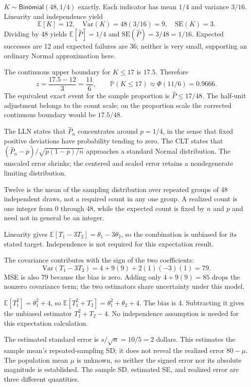 \documentclass[11pt]{article}
\begin{document}
\begin{parts}
\item $K\sim\mathsf{Binomial}(48,1/4)$ exactly. Each indicator has mean $1/4$ and variance $3/16$. Linearity and independence yield
\[
\mathbb E[K]=12,\quad \mathrm{Var}(K)=48(3/16)=9,\quad \mathrm{SE}(K)=3.
\]
Dividing by 48 yields $\mathbb E[\widehat P]=1/4$ and $\mathrm{SE}(\widehat P)=3/48=1/16$. Expected successes are 12 and expected failures are 36; neither is very small, supporting an ordinary Normal approximation here.
\item The continuous upper boundary for $K\leq17$ is $17.5$. Therefore
\[
z=\frac{17.5-12}{3}=\frac{11}{6},\qquad
\mathbb P(K\leq17)\approx\Phi(11/6)=0.9666.
\]
The equivalent exact event for the sample proportion is $\widehat P\leq17/48$. The half-unit adjustment belongs to the count scale; on the proportion scale the corrected continuous boundary would be $17.5/48$.
\item The LLN states that $\widehat P_n$ concentrates around $p=1/4$, in the sense that fixed positive deviations have probability tending to zero. The CLT states that $(\widehat P_n-p)/\sqrt{p(1-p)/n}$ approaches a standard Normal distribution. The unscaled error shrinks; the centered and scaled error retains a nondegenerate limiting distribution.
\item Twelve is the mean of the sampling distribution over repeated groups of 48 independent draws, not a required count in any one group. A realized count is one integer from 0 through 48, while the expected count is fixed by $n$ and $p$ and need not in general be an integer.
\end{parts}

\begin{parts}
\item Linearity gives $\mathbb E[T_1-3T_2]=\theta_1-3\theta_2$, so the combination is unbiased for its stated target. Independence is not required for this expectation result.
\item The covariance contributes with the sign of the two coefficients:
\[
\mathrm{Var}(T_1-3T_2)=4+9(9)+2(1)(-3)(1)=79.
\]
MSE is also 79 because the bias is zero. Adding only $4+9(9)=85$ drops the nonzero covariance term; the two estimators share uncertainty under this model.
\item $\mathbb E[T_1^2]=\theta_1^2+4$, so $\mathbb E[T_1^2+T_2]=\theta_1^2+\theta_2+4$. The bias is 4. Subtracting it gives the unbiased estimator $T_1^2+T_2-4$. No independence assumption is needed for this expectation calculation.
\item The estimated standard error is $s/\sqrt n=10/5=2$ dollars. This estimates the sample mean's repeated-sampling SD; it does not reveal the realized error $80-\mu$. The population mean $\mu$ is unknown, so neither the signed error nor its absolute magnitude is established. The sample SD, estimated SE, and realized error are three different quantities.
\end{parts}
\end{document}
